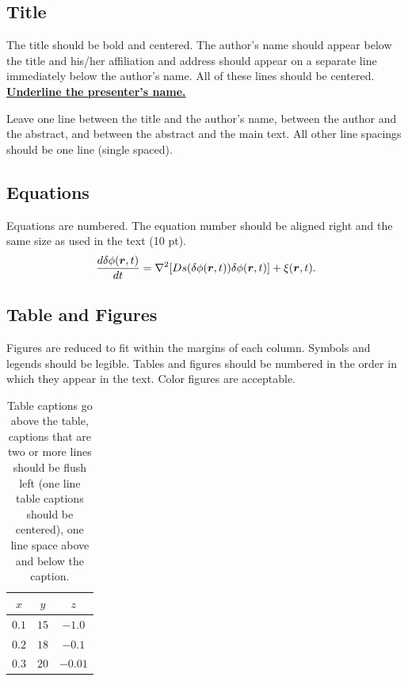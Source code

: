 \documentclass[10pt,twocolumn]{icfd2026paper}
\newcommand{\bm}[1]{\mbox{\boldmath{${#1}$}}}
\begin{document}
\subsection{Title}
The title should be bold and centered.
The author's name should appear below the title and his/her affiliation and address should appear on a separate line immediately below the author's name. 
All of these lines should be centered. \underline{\textbf{Underline the presenter's name.}}




Leave one line between the title and the author's name, between the author and the abstract, and between the abstract and the main text.
All other line spacings should be one line (single spaced).

\subsection{Equations}
Equations are numbered.
The equation number should be aligned right and the same size as used in the text (10 pt).
\begin{eqnarray}
\frac{d \delta \phi (\bm{r}, t)}{dt} = \nabla ^2 [Ds(\delta \phi (\bm{r}, t))\delta \phi (\bm{r}, t)] + \xi (\bm{r}, t).
\end{eqnarray}

\subsection{Table and Figures}
Figures are reduced to fit within the margins of each column.
Symbols and legends should be legible.
Tables and figures should be numbered in the order in which they appear in the text.
Color figures are acceptable.


\begin{table}[h]
\caption{Table captions go above the table, captions that
are two or more lines should be flush left (one line table
captions should be centered), one line space above and
below the caption.}
\begin{center}
 \begin{tabular}{ccc}\hline
 $x$ & $y$ & $z$\\  \hline
 $0.1$ & $15$ & $-1.0$\\
 $0.2$ & $18$ & $-0.1$\\
 $0.3$ & $20$ & $-0.01$\\ \hline
 \end{tabular}
 \end{center}
 \end{table}
\end{document}
